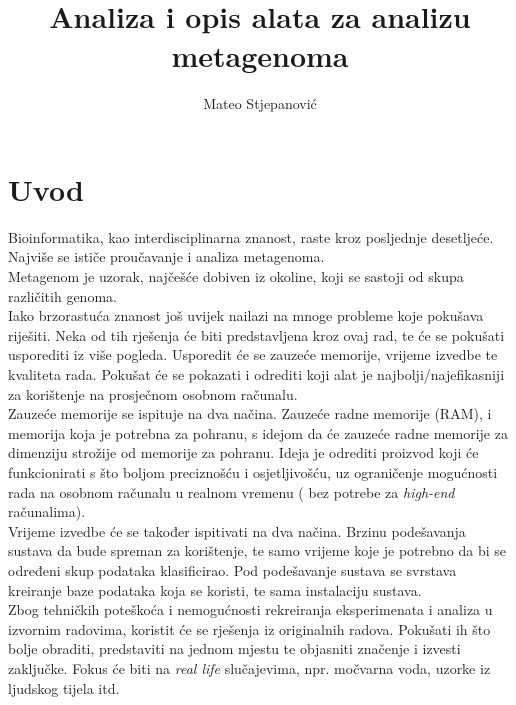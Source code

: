 \documentclass[times, utf8, seminar]{fer}
\begin{document}
\title{Analiza i opis alata za analizu metagenoma}

\author{Mateo Stjepanović}


\maketitle

\tableofcontents

\chapter{Uvod} \label{uvod}
Bioinformatika, kao interdisciplinarna znanost, raste kroz posljednje desetljeće. Najviše se ističe proučavanje i analiza metagenoma.
\\Metagenom je uzorak, najčešće dobiven iz okoline, koji se sastoji od skupa različitih genoma. 
\\Iako brzorastuća znanost još uvijek nailazi na mnoge probleme koje pokušava riješiti. Neka od tih rješenja će biti predstavljena kroz ovaj rad, te će se pokušati usporediti iz više pogleda. Usporedit će se zauzeće memorije, vrijeme izvedbe te kvaliteta rada. Pokušat će se pokazati i odrediti koji alat je najbolji/najefikasniji za korištenje na prosječnom osobnom računalu.
\\Zauzeće memorije se ispituje na dva načina. Zauzeće radne memorije (RAM), i memorija koja je potrebna za pohranu, s idejom da će zauzeće radne memorije za dimenziju strožije od memorije za pohranu. Ideja je odrediti proizvod koji će funkcionirati s što boljom preciznošću i osjetljivošću, uz ograničenje mogućnosti rada na osobnom računalu u realnom vremenu ( bez potrebe za \textit{high-end} računalima).
\\Vrijeme izvedbe će se također ispitivati na dva načina. Brzinu podešavanja sustava da bude spreman za korištenje, te samo vrijeme koje je potrebno da bi se određeni skup podataka klasificirao. Pod podešavanje sustava se svrstava kreiranje baze podataka koja se koristi, te sama instalaciju sustava.
\\Zbog tehničkih poteškoća i nemogućnosti rekreiranja eksperimenata i analiza u izvornim radovima, koristit će se rješenja iz originalnih radova. Pokušati ih što bolje obraditi, predstaviti na jednom mjestu te objasniti značenje i izvesti zaključke. Fokus će biti na \textit{real life} slučajevima, npr. močvarna voda, uzorke iz ljudskog tijela itd.
\end{document}
